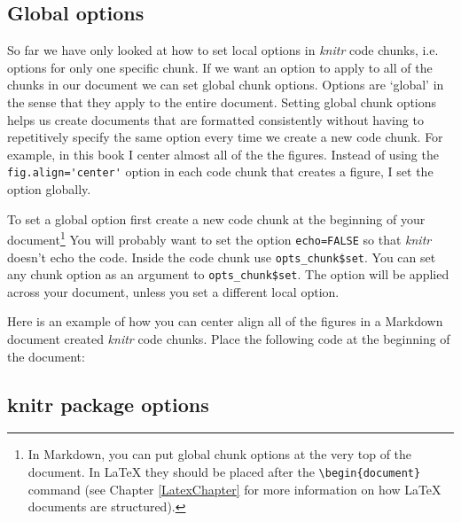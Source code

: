 \subsection{Global options}

So far we have only looked at how to set local options in {\emph{knitr}} code chunks, i.e. options for only one specific chunk. If we want an option to apply to all of the chunks in our document we can set global chunk options. Options are `global' in the sense that they apply to the entire document. Setting global chunk options helps us create documents that are formatted consistently without having to repetitively specify the same option every time we create a new code chunk. For example, in this book I center almost all of the the figures. Instead of using the \verb|fig.align='center'| option in each code chunk that creates a figure, I set the option globally.

To set a global option first create a new code chunk at the beginning of your document\footnote{In Markdown, you can put global chunk options at the very top of the document. In LaTeX they should be placed after the \texttt{\textbackslash{}begin\{document\}} command (see Chapter \ref{LatexChapter} for more information on how LaTeX documents are structured).} You will probably want to set the option {\tt{echo=FALSE}} so that {\emph{knitr}} doesn't echo the code. Inside the code chunk use {\tt{opts\_chunk\$set}}. You can set any chunk option as an argument to {\tt{opts\_chunk\$set}}. The option will be applied across your document, unless you set a different local option. 

Here is an example of how you can center align all of the figures in a Markdown document created {\emph{knitr}} code chunks. Place the following code at the beginning of the document:

\begin{knitrout}
    \color{fgcolor}
\end{knitrout}

\subsection{knitr package options}

